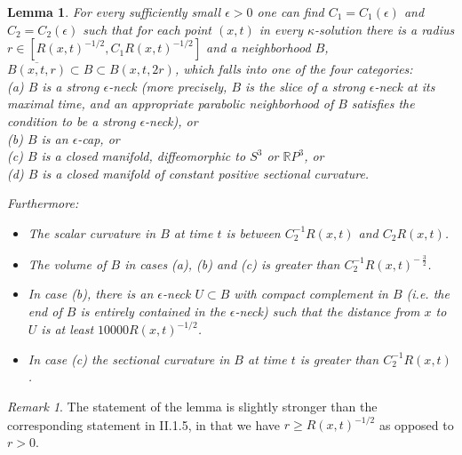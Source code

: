 \documentclass[12pt]{amsart}
\newcommand{\R}{{\mathbb R}}
\newcommand{\eps}{\epsilon}
\numberwithin{equation}{section}
\theoremstyle{plain}
\newtheorem{lemma}[equation]{Lemma}
\theoremstyle{definition}
\theoremstyle{remark}
\newtheorem{remark}[equation]{Remark}
\begin{document}
\begin{lemma} \label{nbhd}
For every sufficiently small $\epsilon > 0$ one can
find $C_1 = C_1(\epsilon)$ and $C_2 = C_2(\epsilon)$
such that for each point $(x, t)$ in every
$\kappa$-solution there is a radius 
$r \in [ R(x,t)^{-1/2}, C_1 R(x,t)^{-1/2}]$ and a neighborhood
$B$, 
$\overline{B(x,t,r)} \subset B \subset B(x,t,2r)$, 
which falls into one
of the four categories: \\
(a) $B$ is a strong $\epsilon$-neck 
(more precisely, $B$ is the slice of a
strong $\epsilon$-neck at its maximal time, and an appropriate parabolic
neighborhood of $B$
satisfies the condition to be a strong $\epsilon$-neck),
or \\
(b) $B$ is an $\epsilon$-cap, or \\
(c) $B$ is a closed manifold, diffeomorphic to $S^3$ or $\R P^3$, or\\
(d) $B$ is a closed manifold of constant positive sectional curvature.

Furthermore:

\begin{itemize}
\item The scalar curvature in $B$ at time $t$ is between
$C_2^{-1} R(x,t)$ and $C_2 R(x,t)$.

\item The volume of $B$ in cases (a), (b) and (c) is
greater than $C_2^{-1} R(x,t)^{- \: \frac32}$.

\item In case (b), there is an $\eps$-neck $U\subset B$ with compact complement in $B$
(i.e. the end of $B$ is entirely contained in the $\eps$-neck) such that the 
distance from $x$ to $U$ is at least $10000R(x,t)^{-1/2}$.

\item In case (c) the 
sectional curvature in $B$ at time $t$ is greater than $C_2^{-1} R(x,t)$.
\end{itemize}
\end{lemma}

\begin{remark}
The statement of the lemma is slightly stronger than the corresponding
statement in II.1.5, in that
we have $r \ge  R(x,t)^{-1/2}$ as opposed to $r > 0$.
\end{remark}
\end{document}
